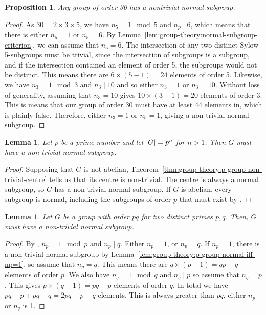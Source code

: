 \documentclass[12pt]{report}
\newtheorem{lemma}[theorem]{Lemma}
\newtheorem{proposition}[theorem]{Proposition}
\theoremstyle{definition}
\begin{document}
\begin{proposition}
  Any group of order 30 has a nontrivial normal subgroup.
\end{proposition}

\begin{proof}
  As \(30 = 2 \times 3 \times 5\), we have \(n_{5} = 1 \mod 5\) and \(n_{p} \mid 6\), which means that there is either \(n_{5} = 1\) or \(n_{5} = 6\). By Lemma~\ref{lem:group-theory:normal-subgroup-criterion}, we can assume that \(n_{5} = 6\). The intersection of any two distinct Sylow 5-subgroups must be trivial, since the intersection of subgroups is a subgroup, and if the intersection contained an element of order 5, the subgroups would not be distinct. This means there are \(6 \times (5-1) = 24\) elements of order 5. Likewise, we have \(n_{3} = 1 \mod 3\) and \(n_{3} \mid 10\) and so either \(n_{3} = 1\) or  \(n_{3} = 10\). Without loss of generality, assuming that \(n_{3} = 10\) gives \(10 \times (3 - 1) = 20\) elements of order 3. This is means that our group of order 30 must have at least 44 elements in, which is plainly false. Therefore, either \(n_{3} = 1\) or \(n_{5} = 1\), giving a non-trivial normal subgroup.
\end{proof}

\begin{lemma}
  Let \(p\) be a prime number and let \(\abs{G} = p^{n}\) for \(n > 1\). Then \(G\) must have a non-trivial normal subgroup.
\end{lemma}

\begin{proof}
  Supposing that \(G\) is not abelian, Theorem~\ref{thm:group-theory:p-group-non-trivial-centre} tells us that its centre is non-trivial. The centre is always a normal subgroup, so \(G\) has a non-trivial normal subgroup. If \(G\) is abelian, every subgroup is normal, including the subgroups of order \(p\) that must exist by .
\end{proof}

\begin{lemma}
  Let \(G\) be a group with order \(pq\) for two distinct primes \(p, q\). Then, \(G\) must have a non-trivial normal subgroup.
\end{lemma}

\begin{proof}
  By , \(n_{p} = 1 \mod p\) and \(n_{p} \mid q\). Either \(n_{p} = 1\), or \(n_{p} = q\). If \(n_{p} = 1\), there is a non-trivial normal subgroup by Lemma~\ref{lem:group-theory:p-group-normal-iff-np=1}, so assume that \(n_{p} = q\). This means there are \(q \times (p - 1) = qp - q\) elements of order \(p\). We also have \(n_{q} = 1 \mod q\) and \(n_{q} \mid p\) so assume that \(n_{q} = p\). This gives \(p \times (q -1) = pq - p\) elements of order \(q\). In total we have \(pq-p + pq-q = 2pq - p - q\) elements. This is always greater than \(pq\), either \(n_{p}\) or \(n_{q}\) is 1.
\end{proof}
\end{document}
